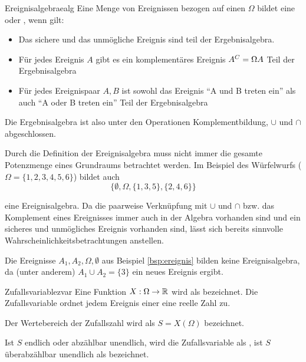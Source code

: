 \begin{definition}{Ereignisalgebra}{ealg}
Eine Menge von Ereignissen bezogen auf einen 
$\Omega$ bildet eine  oder , wenn gilt:

  \begin{itemize}
    \item Das sichere und das unmögliche Ereignis sind teil der Ergebnisalgebra.
    \item{Für jedes Ereignis $A$ gibt es ein komplementäres Ereignis $A^C =
\Omega \\ A$ Teil der Ergebnisalgebra}
    \item{Für jedes Ereignispaar $A,B$ ist sowohl das Ereignis "`A und B treten
ein"' als auch "`A oder B treten ein"' Teil der Ergebnisalgebra}
  \end{itemize}

Die Ergebnisalgebra ist also unter den Operationen Komplementbildung, $\cup$ und
$\cap$ abgeschlossen.
\end{definition}

\begin{example}
Durch die Definition der Ereignisalgebra muss nicht immer die gesamte Potenzmenge
eines Grundraums betrachtet werden. Im Beispiel des Würfelwurfs ($\Omega =
\{1,2,3,4,5,6\}$) bildet auch
\[\{\emptyset, \Omega, \{1,3,5\}, \{2,4,6\}\}\]

eine Ereignisalgebra. Da die paarweise Verknüpfung mit $\cup$ und $\cap$ bzw. das
Komplement eines Ereignisses immer auch in der Algebra vorhanden sind und ein
sicheres und unmögliches Ereignis vorhanden sind, lässt sich bereits sinnvolle
Wahrscheinlichkeitsbetrachtungen anstellen.

Die Ereignisse $A_1, A_2, \Omega, \emptyset$ aus Beispiel \ref{bsp:ereignis}
bilden keine Ereignisalgebra, da (unter anderem) $A_1 \cup A_2 = \{3\}$ ein
neues Ereignis ergibt.
\end{example}


\begin{definition}{Zufallsvariable}{zvar}
Eine Funktion $X: \Omega \to \mathbb{R}$ wird als 
bezeichnet. Die Zufallsvariable ordnet jedem Ereignis einer
 eine reelle Zahl zu.

Der Wertebereich der Zufallszahl wird als  $S = X(\Omega)$
bezeichnet.

Ist $S$ endlich oder abzählbar unendlich, wird die Zufallsvariable als
, ist $S$ überabzählbar unendlich als  bezeichnet.
\end{definition}


